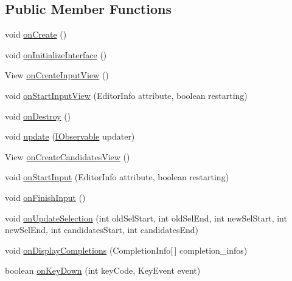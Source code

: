 \subsection*{Public Member Functions}
\begin{DoxyCompactItemize}
\item 
void \hyperlink{classch_1_1zhaw_1_1ba10__bsha__1_1_1ime_1_1HandwritingIME_a391f1eb148d1c08e456d1595516c158c}{onCreate} ()
\item 
void \hyperlink{classch_1_1zhaw_1_1ba10__bsha__1_1_1ime_1_1HandwritingIME_a113e6d863b481e5a9c926dd917d7822a}{onInitializeInterface} ()
\item 
View \hyperlink{classch_1_1zhaw_1_1ba10__bsha__1_1_1ime_1_1HandwritingIME_a920e8e85634fc64519604846302aaa58}{onCreateInputView} ()
\item 
void \hyperlink{classch_1_1zhaw_1_1ba10__bsha__1_1_1ime_1_1HandwritingIME_a731678d503654a151a2204665ec2f018}{onStartInputView} (EditorInfo attribute, boolean restarting)
\item 
void \hyperlink{classch_1_1zhaw_1_1ba10__bsha__1_1_1ime_1_1HandwritingIME_a35c873d879f2440e2a98e2dbca31202f}{onDestroy} ()
\item 
void \hyperlink{classch_1_1zhaw_1_1ba10__bsha__1_1_1ime_1_1HandwritingIME_a788cf4563e1480f6c3ea3ca6f07b2623}{update} (\hyperlink{interfacech_1_1zhaw_1_1ba10__bsha__1_1_1ime_1_1IObservable}{IObservable} updater)
\item 
View \hyperlink{classch_1_1zhaw_1_1ba10__bsha__1_1_1ime_1_1HandwritingIME_a478af9d9f8258613e4e124bdfdd8dc09}{onCreateCandidatesView} ()
\item 
void \hyperlink{classch_1_1zhaw_1_1ba10__bsha__1_1_1ime_1_1HandwritingIME_abb0bfa8e1c7857a88657e6640855af0f}{onStartInput} (EditorInfo attribute, boolean restarting)
\item 
void \hyperlink{classch_1_1zhaw_1_1ba10__bsha__1_1_1ime_1_1HandwritingIME_a1b167f4b94b905a354b0713f15ef4a92}{onFinishInput} ()
\item 
void \hyperlink{classch_1_1zhaw_1_1ba10__bsha__1_1_1ime_1_1HandwritingIME_a372883c8da0f8e41f6acb0d169fc5b6e}{onUpdateSelection} (int oldSelStart, int oldSelEnd, int newSelStart, int newSelEnd, int candidatesStart, int candidatesEnd)
\item 
void \hyperlink{classch_1_1zhaw_1_1ba10__bsha__1_1_1ime_1_1HandwritingIME_a5e02e524ed9e962644d630cc0facda16}{onDisplayCompletions} (CompletionInfo\mbox{[}$\,$\mbox{]} completion\_\-infos)
\item 
boolean \hyperlink{classch_1_1zhaw_1_1ba10__bsha__1_1_1ime_1_1HandwritingIME_a999c8827bbffc0388be05c9e87e2ac49}{onKeyDown} (int keyCode, KeyEvent event)

\end{DoxyCompactItemize}
